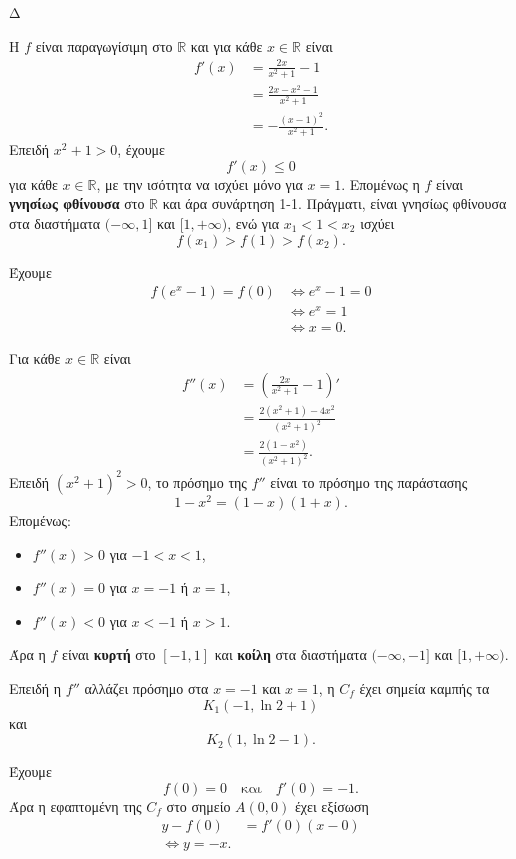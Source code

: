 \begin{thema}{Δ}
\begin{erwthma}
\item Η $f$ είναι παραγωγίσιμη στο $\mathbb{R}$ και για κάθε $x\in\mathbb{R}$ είναι
\begin{align*}
f'(x)
&=\frac{2x}{x^2+1}-1\\
&=\frac{2x-x^2-1}{x^2+1}\\
&=-\frac{(x-1)^2}{x^2+1}.
\end{align*}
Επειδή $x^2+1>0$, έχουμε
\[
f'(x)\leq0
\]
για κάθε $x\in\mathbb{R}$, με την ισότητα να ισχύει μόνο για $x=1$. Επομένως η $f$ είναι \textbf{γνησίως φθίνουσα} στο $\mathbb{R}$ και άρα συνάρτηση 1-1.
Πράγματι, είναι γνησίως φθίνουσα στα διαστήματα $(-\infty,1]$ και $[1,+\infty)$, ενώ για $x_1<1<x_2$ ισχύει
\[
f(x_1)>f(1)>f(x_2).
\]

Έχουμε
\begin{align*}
f(e^x-1)=f(0)
&\Leftrightarrow e^x-1=0\\
&\Leftrightarrow e^x=1\\
&\Leftrightarrow {x=0}.
\end{align*}

\item Για κάθε $x\in\mathbb{R}$ είναι
\begin{align*}
f''(x)
&=\left(\frac{2x}{x^2+1}-1\right)'\\
&=\frac{2(x^2+1)-4x^2}{(x^2+1)^2}\\
&=\frac{2(1-x^2)}{(x^2+1)^2}.
\end{align*}
Επειδή $(x^2+1)^2>0$, το πρόσημο της $f''$ είναι το πρόσημο της παράστασης
\[
1-x^2=(1-x)(1+x).
\]
Επομένως:
\begin{itemize}
\item $f''(x)>0$ για $-1<x<1$,
\item $f''(x)=0$ για $x=-1$ ή $x=1$,
\item $f''(x)<0$ για $x<-1$ ή $x>1$.
\end{itemize}
Άρα η $f$ είναι \textbf{κυρτή} στο $[-1,1]$ και \textbf{κοίλη} στα διαστήματα $(-\infty,-1]$ και $[1,+\infty)$.

Επειδή η $f''$ αλλάζει πρόσημο στα $x=-1$ και $x=1$, η $C_f$ έχει σημεία καμπής τα
\[
{K_1(-1,\ln2+1)}
\]
και
\[
{K_2(1,\ln2-1)}.
\]

\item Έχουμε
\[
f(0)=0
\quad\text{και}\quad
f'(0)=-1.
\]
Άρα η εφαπτομένη της $C_f$ στο σημείο $A(0,0)$ έχει εξίσωση
\begin{align*}
y-f(0)&=f'(0)(x-0)\\
\Leftrightarrow {y=-x}.
\end{align*}


\end{erwthma}
\end{thema}
